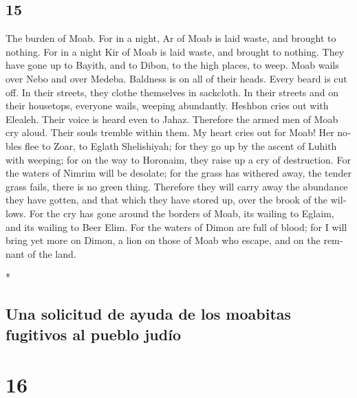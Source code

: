 \begin{paracol}{2}
\begin{otherlanguage}{english}
\hypertarget{section-29}{%
\section{15}\label{section-29}}

 The burden of Moab. For in a night, Ar of Moab is laid
waste, and brought to nothing. For in a night Kir of Moab is laid waste,
and brought to nothing.  They have gone up to Bayith, and
to Dibon, to the high places, to weep. Moab wails over Nebo and over
Medeba. Baldness is on all of their heads. Every beard is cut off.
 In their streets, they clothe themselves in sackcloth. In
their streets and on their housetops, everyone wails, weeping
abundantly.  Heshbon cries out with Elealeh. Their voice
is heard even to Jahaz. Therefore the armed men of Moab cry aloud. Their
souls tremble within them.  My heart cries out for Moab!
Her nobles flee to Zoar, to Eglath Shelishiyah; for they go up by the
ascent of Luhith with weeping; for on the way to Horonaim, they raise up
a cry of destruction.  For the waters of Nimrim will be
desolate; for the grass has withered away, the tender grass fails, there
is no green thing.  Therefore they will carry away the
abundance they have gotten, and that which they have stored up, over the
brook of the willows.  For the cry has gone around the
borders of Moab, its wailing to Eglaim, and its wailing to Beer Elim.
 For the waters of Dimon are full of blood; for I will
bring yet more on Dimon, a lion on those of Moab who escape, and on the
remnant of the land.

\end{otherlanguage}

\switchcolumn[0]*

\hypertarget{una-solicitud-de-ayuda-de-los-moabitas-fugitivos-al-pueblo-juduxedo}{%
\subsection{Una solicitud de ayuda de los moabitas fugitivos al pueblo
judío}\label{una-solicitud-de-ayuda-de-los-moabitas-fugitivos-al-pueblo-juduxedo}}

\hypertarget{section-30}{%
\section{16}\label{section-30}}


\end{paracol}

